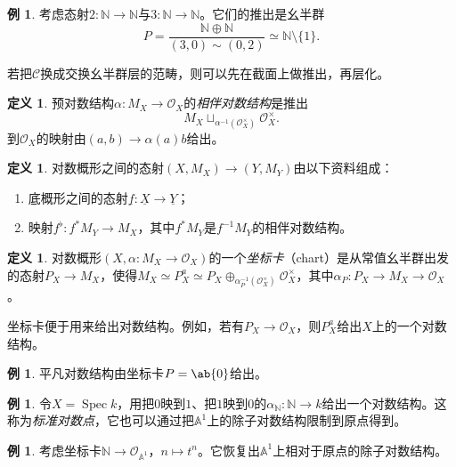 \documentclass{amsart}
\theoremstyle{definition}
\newtheorem{defn}[thm]{定义}
\newtheorem{exm}[thm]{例}
\theoremstyle{remark}
\theoremstyle{plain}
\theoremstyle{definition}
\theoremstyle{remark}
\newcommand{\A}{\mathbb{A}}
\newcommand{\N}{\mathbb{N}}
\newcommand{\mc}[1]{\mathcal{#1}}
\newcommand{\ul}[1]{\underline{#1}}
\newcommand{\1}{\mathbf{1}}
\newcommand{\2}{\mathbf{2}}
\newcommand{\3}{\mathbf{3}}
\DeclareMathOperator{\Spec}{Spec}
\begin{document}
\begin{exm}
    考虑态射\(2 \colon \N \to \N\)与\(3 \colon \N \to \N\)。它们的推出是幺半群
    \[ P = \frac{\N \oplus \N}{(3, 0) \sim (0,2)} \simeq \N \setminus \{1\}. \]
\end{exm}

若把\(\mc{C}\)换成交换幺半群层的范畴，则可以先在截面上做推出，再层化。

\begin{defn}
    预对数结构\(\alpha \colon M_X \to \mc{O}_X\)的\textit{相伴对数结构}是推出
    \[ M_X \sqcup_{\alpha^{-1}(\mc{O}_X^{\times})} \mc{O}_X^{\times}. \]
    到\(\mc{O}_X\)的映射由\((a,b) \to \alpha(a) b\)给出。
\end{defn}

\begin{defn}
    对数概形之间的态射\((X, M_X) \to (Y, M_Y)\)由以下资料组成：
    \begin{enumerate}
        \item 底概形之间的态射\(\ul{f} \colon \ul{X} \to \ul{Y}\)；
        \item 映射\(f^{\flat} \colon f^* M_Y \to M_X\)，其中\(f^* M_Y\)是\(f^{-1} M_Y\)的相伴对数结构。
    \end{enumerate}
\end{defn}

\begin{defn}
    对数概形\((X, \alpha \colon M_X \to \mc{O}_X)\)的一个\textit{坐标卡}（chart）是从常值幺半群出发的态射\(P_X \to M_X\)，使得\(M_X \simeq P_X^a \simeq P_X \oplus_{\alpha_P^{-1}(\mc{O}_X^{\times})} \mc{O}_X^{\times}\)，其中\(\alpha_P \colon P_X \to M_X \to \mc{O}_X\)。
\end{defn}

坐标卡便于用来给出对数结构。例如，若有\(P_X \to \mc{O}_X\)，则\(P_X^a\)给出\(X\)上的一个对数结构。

\begin{exm}
    平凡对数结构由坐标卡\(P = \ab\{0\}\)给出。
\end{exm}

\begin{exm}
    令\(X = \Spec k\)，用把\(0\)映到\(1\)、把\(1\)映到\(0\)的\(\alpha_{\N} \colon \N \to k\)给出一个对数结构。这称为\textit{标准对数点}，它也可以通过把\(\A^1\)上的除子对数结构限制到原点得到。
\end{exm}

\begin{exm}
    考虑坐标卡\(\N \to \mc{O}_{\A^1}\)，\(n \mapsto t^n\)。它恢复出\(\A^1\)上相对于原点的除子对数结构。
\end{exm}
\end{document}
